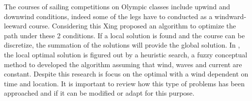 The courses of sailing competitions on Olympic classes include upwind and downwind conditions, indeed some of the legs have to conducted as a windward-leeward course. Considering this Xing \cite{xing2012path} proposed an algorithm to optimize the path under these 2 conditions. If a local solution is found and the course can be discretize, the summation of the solutions will provide the global solution. In \cite{xing2012path},  the local optimal solution is figured out by a heuristic search, a fuzzy conceptual method to developed  the algorithm assuming that wind, waves and current are constant.
Despite this research is focus on the optimal with a wind dependent on time and location. It is important to review how this type of problems has been approached  and if it can be modified or adapt for this purpose.\\
